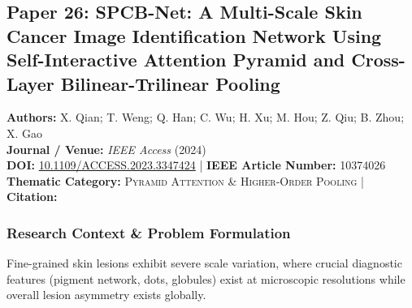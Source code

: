 \subsection{Paper 26: SPCB-Net: A Multi-Scale Skin Cancer Image Identification Network Using Self-Interactive Attention Pyramid and Cross-Layer Bilinear-Trilinear Pooling}
\label{sec:paper_26}

\begin{tcolorbox}[colback=gray!5!white,colframe=gray!75!black,title=\textbf{Metadata \& Citation Summary}]
\textbf{Authors:} X. Qian; T. Weng; Q. Han; C. Wu; H. Xu; M. Hou; Z. Qiu; B. Zhou; X. Gao \\
\textbf{Journal / Venue:} \textit{IEEE Access} (2024) \\
\textbf{DOI:} \href{https://doi.org/10.1109/ACCESS.2023.3347424}{10.1109/ACCESS.2023.3347424} \quad | \quad \textbf{IEEE Article Number:} 10374026 \\
\textbf{Thematic Category:} \textsc{Pyramid Attention \& Higher-Order Pooling} \quad | \quad \textbf{Citation:} \cite{10374026}
\end{tcolorbox}

\subsubsection*{Research Context \& Problem Formulation}
Fine-grained skin lesions exhibit severe scale variation, where crucial diagnostic features (pigment network, dots, globules) exist at microscopic resolutions while overall lesion asymmetry exists globally.

